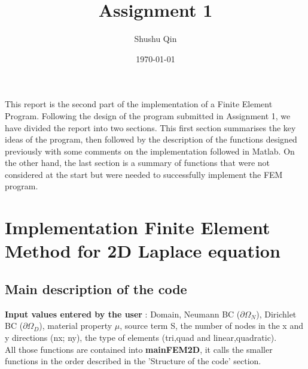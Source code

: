\documentclass[a4paper,12pt,twoside,english]{article}
\begin{document}
\title{Assignment 1}

\author[1]{Shushu Qin}
\date{\today}
\maketitle
	
This report is the second part of the implementation of a Finite Element Program. Following the design of the program submitted in Assignment 1, we have divided the report into two sections.  This first section summarises the key ideas of the program, then followed by the description of the functions designed previously with some comments on the implementation followed in Matlab. On the other hand, the last section is a summary of functions that were not considered at the start but were needed to successfully implement the FEM program.
	
\section{Implementation Finite Element Method for 2D Laplace equation}
	

\vspace{0.5cm}

\subsection{Main description of the code}


\textbf{Input values entered by the user} : Domain, Neumann BC ($\partial\Omega_N$), Dirichlet BC ($\partial\Omega_D$), material property $\mu$, source term S, the number of nodes in the x and y directions (nx; ny), the type of elements (tri,quad and linear,quadratic).\\

All those functions are contained into \textbf{mainFEM2D}, it calls the smaller functions in the order described in the 'Structure of the code' section.
\end{document}
